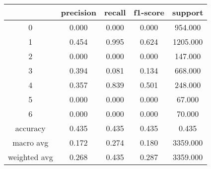 \begin{table}[htb]
    \centering
    \begin{tabular}{@{}ccccc@{}}
        \toprule
         & precision & recall & f1-score & support \\
        \midrule
        0 & 0.000 & 0.000 & 0.000 & 954.000 \\
        1 & 0.454 & 0.995 & 0.624 & 1205.000 \\
        2 & 0.000 & 0.000 & 0.000 & 147.000 \\
        3 & 0.394 & 0.081 & 0.134 & 668.000 \\
        4 & 0.357 & 0.839 & 0.501 & 248.000 \\
        5 & 0.000 & 0.000 & 0.000 & 67.000 \\
        6 & 0.000 & 0.000 & 0.000 & 70.000 \\
        accuracy & 0.435 & 0.435 & 0.435 & 0.435 \\
        macro avg & 0.172 & 0.274 & 0.180 & 3359.000 \\
        weighted avg & 0.268 & 0.435 & 0.287 & 3359.000 \\
        \bottomrule
    \end{tabular}
\end{table}